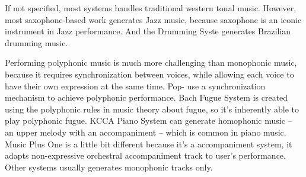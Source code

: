 If not specified, most systems handles traditional western tonal music. However, most saxophone-based work \cite{40, 41, 42} generates Jazz music, because saxophone is an iconic instrument in Jazz performance. And the Drumming Syste \cite{56} generates Brazilian drumming music.%

Performing polyphonic music is much more challenging than monophonic music, because it requires synchronization between voices, while allowing each voice to have their own expression at the same time. Pop- \cite{28} use a synchronization mechanism to achieve polyphonic performance. Bach Fugue System \cite{23} is created using the polyphonic rules in music theory about fugue, so it's inherently able to play polyphonic fugue. KCCA Piano System \cite{57}can generate homophonic music -- an upper melody with an accompaniment -- which is common in piano music.  Music Plus One \cite{52,53,54} is a little bit different because it's a accompaniment system, it adapts non-expressive orchestral accompaniment track to user's performance. Other systems usually generates monophonic tracks only. 

